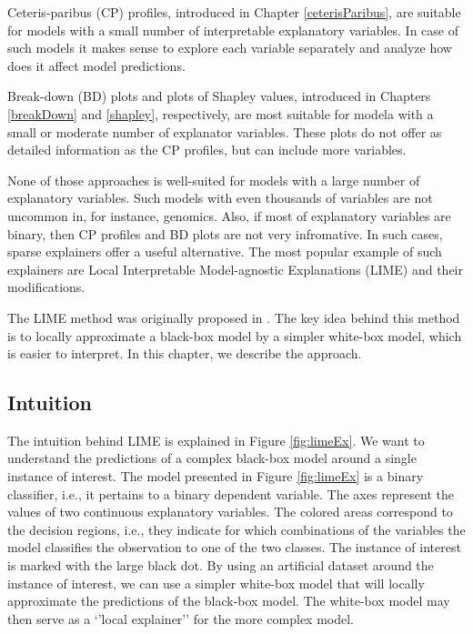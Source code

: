 \documentclass[12pt,]{krantz}
\begin{document}
Ceteris-paribus (CP) profiles, introduced in Chapter \ref{ceterisParibus}, are suitable for models with a small number of interpretable explanatory variables. In case of such models it makes sense to explore each variable separately and analyze how does it affect model predictions.

Break-down (BD) plots and plots of Shapley values, introduced in Chapters \ref{breakDown} and \ref{shapley}, respectively, are most suitable for modela with a small or moderate number of explanator variables. These plots do not offer as detailed information as the CP profiles, but can include more variables.

None of those approaches is well-suited for models with a large number of explanatory variables. Such models with even thousands of variables are not uncommon in, for instance, genomics. Also, if most of explanatory variables are binary, then CP profiles and BD plots are not very infromative. In such cases, sparse explainers offer a useful alternative. The most popular example of such explainers are Local Interpretable Model-agnostic Explanations (LIME) and their modifications.

The LIME method was originally proposed in \citep{lime}. The key idea behind this method is to locally approximate a black-box model by a simpler white-box model, which is easier to interpret. In this chapter, we describe the approach.

\hypertarget{LIMEIntuition}{%
\subsection{Intuition}\label{LIMEIntuition}}

The intuition behind LIME is explained in Figure \ref{fig:limeEx}. We want to understand the predictions of a complex black-box model around a single instance of interest. The model presented in Figure \ref{fig:limeEx} is a binary classifier, i.e., it pertains to a binary dependent variable. The axes represent the values of two continuous explanatory variables. The colored areas correspond to the decision regions, i.e., they indicate for which combinations of the variables the model classifies the observation to one of the two classes. The instance of interest is marked with the large black dot. By using an artificial dataset around the instance of interest, we can use a simpler white-box model that will locally approximate the predictions of the black-box model. The white-box model may then serve as a `'local explainer'' for the more complex model.
\end{document}
